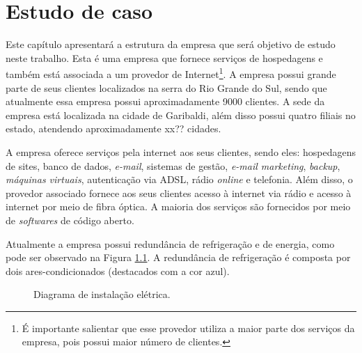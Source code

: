 \chapter{Estudo de caso}
\label{cap:estudodecaso}

Este capítulo apresentará a estrutura da empresa que será objetivo de estudo neste trabalho. Esta é uma empresa que fornece serviços de 
hospedagens e também está associada a um provedor de Internet\footnote[1]{É importante salientar que esse provedor utiliza a maior parte dos 
serviços da empresa, pois possui maior número de clientes.}. A empresa possui grande parte de seus clientes localizados na serra do 
Rio Grande do Sul, sendo que atualmente essa empresa possui aproximadamente 9000 clientes. A sede da empresa está localizada na cidade de 
Garibaldi, além disso possui quatro filiais no estado, atendendo aproximadamente xx?? cidades.

A empresa oferece serviços pela internet aos seus clientes, sendo eles: hospedagens de sites, banco de dados, \textit{e-mail}, sistemas de gestão, 
\textit{e-mail marketing}, \textit{backup}, \textit{máquinas virtuais}, autenticação via \ac{ADSL}, rádio \textit{online} e telefonia.
Além disso, o provedor associado fornece aos seus clientes acesso à internet via rádio e acesso à internet por meio de fibra óptica.
A maioria dos serviços são fornecidos por meio de \textit{softwares} de código aberto.

Atualmente a empresa possui redundância de refrigeração e de energia, como pode ser observado na Figura \ref{fig:insteletrica}. 
A redundância de refrigeração é composta por dois ares-condicionados (destacados com a cor azul). 

\begin{figure}[h!]
 \centering
 \caption{Diagrama de instalação elétrica.}
 \label{fig:insteletrica}
\end{figure}

